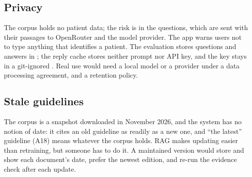 \subsection{Privacy}

The corpus holds no patient data; the risk is in the questions, which are sent with their passages to OpenRouter and the model provider. The app warns users not to type anything that identifies a patient. The evaluation stores questions and answers in ; the reply cache stores neither prompt nor API key, and the key stays in a git-ignored . Real use would need a local model or a provider under a data processing agreement, and a retention policy.

\subsection{Stale guidelines}

The corpus is a snapshot downloaded in November 2026, and the system has no notion of date: it cites an old guideline as readily as a new one, and ``the latest'' guideline (A18) means whatever the corpus holds. RAG makes updating easier than retraining, but someone has to do it. A maintained version would store and show each document's date, prefer the newest edition, and re-run the evidence check after each update.

